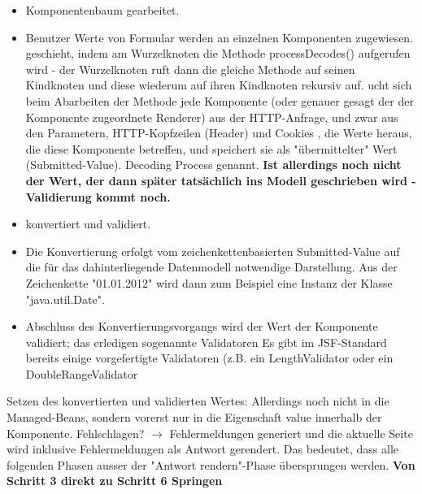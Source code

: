 \documentclass[a4paper,10pt]{scrreprt}
\begin{document}
{\begin{description}
\begin{itemize}
                                                          \end{itemize}
\item[Phase 2: Request-Parameter anwenden (Apply Request Values)] \begin{itemize}
                                                                   \item Komponentenbaum gearbeitet.
                                                                   \item Benutzer Werte von Formular werden an einzelnen Komponenten zugewiesen.
                                                                   \subitem geschieht, indem am
Wurzelknoten die Methode processDecodes() aufgerufen wird - der Wurzelknoten ruft dann die
gleiche Methode auf seinen Kindknoten und diese wiederum auf ihren Kindknoten rekursiv auf.
\subitem ucht sich beim Abarbeiten der Methode jede Komponente (oder genauer gesagt der
der Komponente zugeordnete Renderer) aus der HTTP-Anfrage, und zwar aus den Parametern,
HTTP-Kopfzeilen (Header) und Cookies , die Werte heraus, die diese Komponente betreffen, und
speichert sie als "übermittelter" Wert (Submitted-Value). 
\subitem Decoding Process genannt.
\subitem \textbf{Ist allerdings noch nicht der Wert, der dann später
tatsächlich ins Modell geschrieben wird - Validierung kommt noch.}
                                                                  \end{itemize}
\item [Phase 3: Konvertierung und Validierung durchführen (Process Validations)] \begin{itemize}
                                                                                  \item konvertiert
und validiert.
\item Die Konvertierung erfolgt vom zeichenkettenbasierten Submitted-Value auf die für das
dahinterliegende Datenmodell notwendige Darstellung. Aus der Zeichenkette "01.01.2012" wird
dann zum Beispiel eine Instanz der Klasse "java.util.Date".
\item Abschluss des Konvertierungsvorgangs wird der Wert der
Komponente validiert; das erledigen sogenannte Validatoren
\subitem Es gibt im JSF-Standard bereits einige
vorgefertigte Validatoren (z.B. ein LengthValidator oder ein DoubleRangeValidator
                                                                                 \end{itemize}
\item[Zwischenbemerkung]  Setzen des konvertierten und validierten Wertes: Allerdings noch
nicht in die Managed-Beans, sondern vorerst nur in die Eigenschaft value innerhalb der
Komponente.  Fehlschlagen? $ \rightarrow$ Fehlermeldungen generiert und die aktuelle Seite wird inklusive
Fehlermeldungen als Antwort gerendert. Das bedeutet, dass alle folgenden Phasen ausser der
"Antwort rendern"-Phase übersprungen werden.
\textbf{Von Schritt 3 direkt zu Schritt 6 Springen}


\end{description}}
\end{document}
